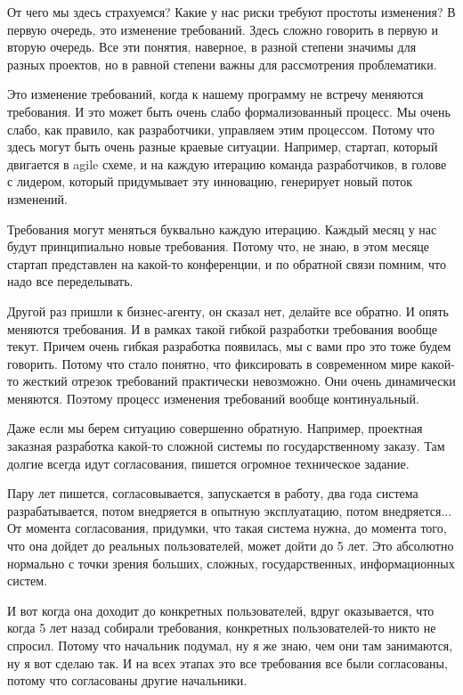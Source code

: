 От чего мы здесь страхуемся? Какие у нас риски требуют простоты изменения? В первую очередь, это изменение требований. Здесь сложно говорить в первую и вторую очередь. Все эти понятия, наверное, в разной степени значимы для разных проектов, но в равной степени важны для рассмотрения проблематики.

Это изменение требований, когда к нашему программу не встречу меняются требования. И это может быть очень слабо формализованный процесс. Мы очень слабо, как правило, как разработчики, управляем этим процессом. Потому что здесь могут быть очень разные краевые ситуации. Например, стартап, который двигается в agile схеме, и на каждую итерацию команда разработчиков, в голове с лидером, который придумывает эту инновацию, генерирует новый поток изменений. 

Требования могут меняться буквально каждую итерацию. Каждый месяц у нас будут принципиально новые требования. Потому что, не знаю, в этом месяце стартап представлен на какой-то конференции, и по обратной связи помним, что надо все переделывать.

Другой раз пришли к бизнес-агенту, он сказал нет, делайте все обратно. И опять меняются требования. И в рамках такой гибкой разработки требования вообще текут. Причем очень гибкая разработка появилась, мы с вами про это тоже будем говорить. Потому что стало понятно, что фиксировать в современном мире какой-то жесткий отрезок требований практически невозможно. Они очень динамически меняются. Поэтому процесс изменения требований вообще континуальный.

Даже если мы берем ситуацию совершенно обратную. Например, проектная заказная разработка какой-то сложной системы по государственному заказу. Там долгие всегда идут согласования, пишется огромное техническое задание.

Пару лет пишется, согласовывается, запускается в работу, два года система разрабатывается, потом внедряется в опытную эксплуатацию, потом внедряется... От момента согласования, придумки, что такая система нужна, до момента того, что она дойдет до реальных пользователей, может дойти до 5 лет. Это абсолютно нормально с точки зрения больших, сложных, государственных, информационных систем.

И вот когда она доходит до конкретных пользователей, вдруг оказывается, что когда 5 лет назад собирали требования, конкретных пользователей-то никто не спросил. Потому что начальник подумал, ну я же знаю, чем они там занимаются, ну я вот сделаю так. И на всех этапах это все требования все были согласованы, потому что согласованы другие начальники.

